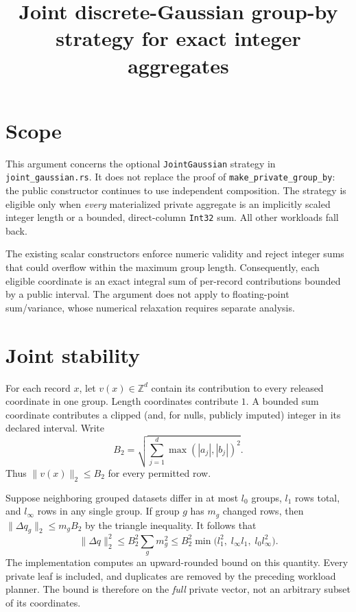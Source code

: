 \documentclass{article}
\title{Joint discrete-Gaussian group-by strategy for exact integer aggregates}
\date{}
\begin{document}
\maketitle

\section{Scope}

This argument concerns the optional \texttt{JointGaussian} strategy in
\texttt{joint\_gaussian.rs}. It does not replace the proof of
\texttt{make\_private\_group\_by}: the public constructor continues to use
independent composition. The strategy is eligible only when \emph{every}
materialized private aggregate is an implicitly scaled integer length or a
bounded, direct-column \texttt{Int32} sum. All other workloads fall back.

The existing scalar constructors enforce numeric validity and reject integer
sums that could overflow within the maximum group length. Consequently, each
eligible coordinate is an exact integral sum of per-record contributions
bounded by a public interval. The argument does not apply to floating-point
sum/variance, whose numerical relaxation requires separate analysis.

\section{Joint stability}

For each record \(x\), let \(v(x)\in\mathbb Z^d\) contain its contribution to
every released coordinate in one group. Length coordinates contribute \(1\).
A bounded sum coordinate contributes a clipped (and, for nulls, publicly
imputed) integer in its declared interval. Write
\[
 B_2=\sqrt{\sum_{j=1}^d \max(|a_j|,|b_j|)^2}.
\]
Thus \(\|v(x)\|_2\le B_2\) for every permitted row.

Suppose neighboring grouped datasets differ in at most \(l_0\) groups,
\(l_1\) rows total, and \(l_\infty\) rows in any single group. If group \(g\)
has \(m_g\) changed rows, then
\(\|\Delta q_g\|_2\le m_g B_2\) by the triangle inequality.
It follows that
\[
  \|\Delta q\|_2^2
  \le B_2^2\sum_g m_g^2
  \le B_2^2\min\bigl(
    l_1^2,\; l_\infty l_1,\; l_0 l_\infty^2
  \bigr).
\]
The implementation computes an upward-rounded bound on this quantity.
Every private leaf is included, and duplicates are removed by the preceding
workload planner. The bound is therefore on the \emph{full} private vector,
not an arbitrary subset of its coordinates.
\end{document}

